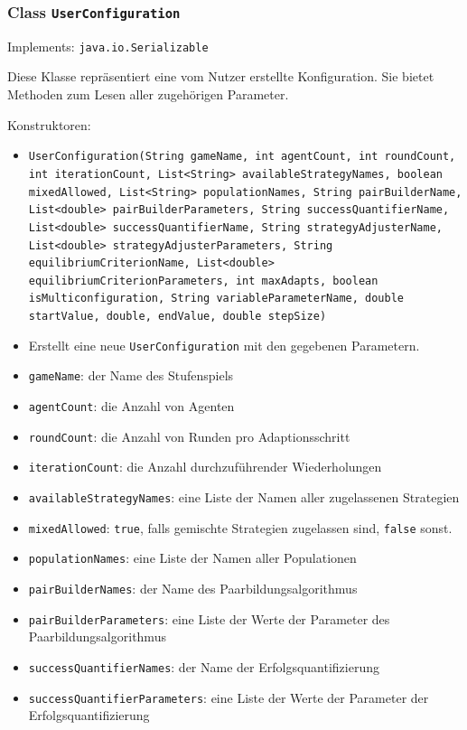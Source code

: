 \documentclass[parskip=full,11pt]{scrartcl}
\begin{document}
\subsubsection{Class \texttt{UserConfiguration}}
Implements: \texttt{java.io.Serializable}

Diese Klasse repräsentiert eine vom Nutzer erstellte Konfiguration. Sie bietet Methoden zum Lesen aller zugehörigen Parameter.

Konstruktoren:
\begin{itemize}\itemsep -10pt
\item \texttt{UserConfiguration(String gameName, int agentCount, int roundCount, int iterationCount, List<String> availableStrategyNames, boolean mixedAllowed, List<String> populationNames, String pairBuilderName, List<double> pairBuilderParameters, String successQuantifierName, List<double> successQuantifierName, String strategyAdjusterName, List<double> strategyAdjusterParameters, String equilibriumCriterionName, List<double> equilibriumCriterionParameters, int maxAdapts, boolean isMulticonfiguration, String variableParameterName, double startValue, double, endValue, double stepSize)}
\item[] Erstellt eine neue \texttt{UserConfiguration} mit den gegebenen Parametern.
\item[] \texttt{gameName}: der Name des Stufenspiels
\item[] \texttt{agentCount}: die Anzahl von Agenten
\item[] \texttt{roundCount}: die Anzahl von Runden pro Adaptionsschritt
\item[] \texttt{iterationCount}: die Anzahl durchzuführender Wiederholungen
\item[] \texttt{availableStrategyNames}: eine Liste der Namen aller zugelassenen Strategien
\item[] \texttt{mixedAllowed}: \texttt{true}, falls gemischte Strategien zugelassen sind, \texttt{false} sonst.
\item[] \texttt{populationNames}: eine Liste der Namen aller Populationen
\item[] \texttt{pairBuilderNames}: der Name des Paarbildungsalgorithmus
\item[] \texttt{pairBuilderParameters}: eine Liste der Werte der Parameter des Paarbildungsalgorithmus
\item[] \texttt{successQuantifierNames}: der Name der Erfolgsquantifizierung
\item[] \texttt{successQuantifierParameters}: eine Liste der Werte der Parameter der Erfolgsquantifizierung

\end{itemize}
\end{document}
